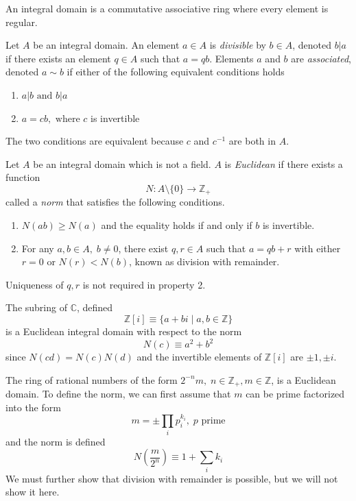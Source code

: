 \documentclass{article}
\begin{document}
      \begin{proposition}
        An integral domain is a commutative associative ring where every element is regular. 
      \end{proposition}

      \begin{definition}
        Let $A$ be an integral domain. An element $a \in A$ is \textit{divisible} by $b \in A$, denoted $b | a$ if there exists an element $q \in A$ such that $a = q b$. Elements $a$ and $b$ are \textit{associated}, denoted $a \sim b$ if either of the following equivalent conditions holds
        \begin{enumerate}
            \item $a | b \text{ and } b | a$
            \item $a = c b, \text{ where } c$ is invertible
        \end{enumerate}
        The two conditions are equivalent because $c$ and $c^{-1}$ are both in $A$. 
      \end{definition}

      \begin{definition}
        Let $A$ be an integral domain which is not a field. $A$ is \textit{Euclidean} if there exists a function 
        \[ N: A \setminus \{ 0 \} \longrightarrow \mathbb{Z}_+\]
        called a \textit{norm} that satisfies the following conditions. 
        \begin{enumerate}
          \item $N(a b) \geq N(a)$ and the equality holds if and only if $b$ is invertible. 
          \item For any $a, b \in A, \; b \neq 0$, there exist $q, r \in A$ such that $a = q b + r$ with either $r = 0$ or $ N(r) < N(b)$, known as division with remainder. 
        \end{enumerate}
        Uniqueness of $q, r$ is not required in property 2. 
      \end{definition}

      \begin{example}
        The subring of $\mathbb{C}$, defined
        \[ \mathbb{Z}[i] \equiv \{ a + b i \; | \; a, b \in \mathbb{Z} \} \]
        is a Euclidean integral domain with respect to the norm 
        \[ N(c) \equiv a^2 + b^2\]
        since $N(c d) = N(c) N(d)$ and the invertible elements of $\mathbb{Z}[i]$ are $\pm 1, \pm i$. 
      \end{example}

      \begin{example}
        The ring of rational numbers of the form $2^{-n} m, \; n \in \mathbb{Z}_+, m \in \mathbb{Z}$, is a Euclidean domain. To define the norm, we can first assume that $m$ can be prime factorized into the form 
        \[ m = \pm \prod_{i} p_{i}^{k_i}, \; p \text{ prime}\]
        and the norm is defined 
        \[ N(\frac{m}{2^n}) \equiv 1 + \sum_i k_i\]
        We must further show that division with remainder is possible, but we will not show it here. 
      \end{example}
\end{document}
